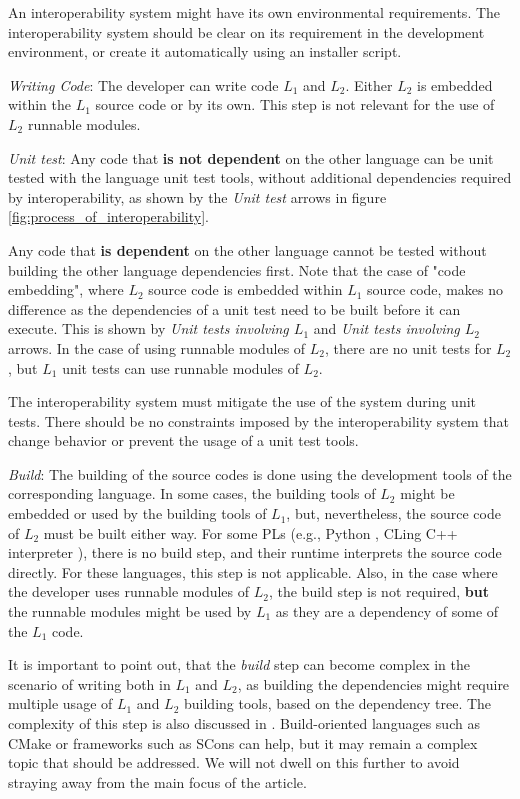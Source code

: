 \documentclass[sigplan,10pt,manuscript,nonacm]{acmart}
\begin{document}
An interoperability system might have its own environmental requirements. The interoperability system should be clear on its requirement in the development environment, or create it automatically using an installer script.

\textit{Writing Code}: The developer can write code $L_1$ and $L_2$. Either $L_2$ is embedded within the $L_1$ source code or by its own. This step is not relevant for the use of $L_2$ runnable modules.

\textit{Unit test}: Any code that \textbf{is not dependent} on the other language can be unit tested with the language unit test tools, without additional dependencies required by interoperability, as shown by the \emph{Unit test} arrows in figure \ref{fig:process_of_interoperability}.

Any code that \textbf{is dependent} on the other language cannot be tested without building the other language dependencies first. Note that the case of "code embedding", where $L_2$ source code is embedded within $L_1$ source code, makes no difference as the dependencies of a unit test need to be built before it can execute. This is shown by \emph{Unit tests involving $L_1$} and \emph{Unit tests involving $L_2$} arrows. In the case of using runnable modules of $L_2$, there are no unit tests for $L_2$, but $L_1$ unit tests can use runnable modules of $L_2$.

The interoperability system must mitigate the use of the system during unit tests. There should be no constraints imposed by the interoperability system that change behavior or prevent the usage of a unit test tools.

\textit{Build}: The building of the source codes is done using the development tools of the corresponding language. In some cases, the building tools of $L_2$ might be embedded or used by the building tools of $L_1$, but, nevertheless, the source code of $L_2$ must be built either way. For some PLs (e.g., Python \cite{cpython}, CLing C++ interpreter \cite{Cling}), there is no build step, and their runtime interprets the source code directly. For these languages, this step is not applicable. Also, in the case where the developer uses runnable modules of $L_2$, the build step is not required, \textbf{but} the runnable modules might be used by $L_1$ as they are a dependency of some of the $L_1$ code.

It is important to point out, that the \textit{build} step can become complex in the scenario of writing both in $L_1$ and $L_2$, as building the dependencies might require multiple usage of $L_1$ and $L_2$ building tools, based on the dependency tree. The complexity of this step is also discussed in \cite{multilingual_systems_constructed}. Build-oriented languages such as CMake \cite{cmake} or frameworks such as SCons \cite{scons} can help, but it may remain a complex topic that should be addressed. We will not dwell on this further to avoid straying away from the main focus of the article.
\end{document}
